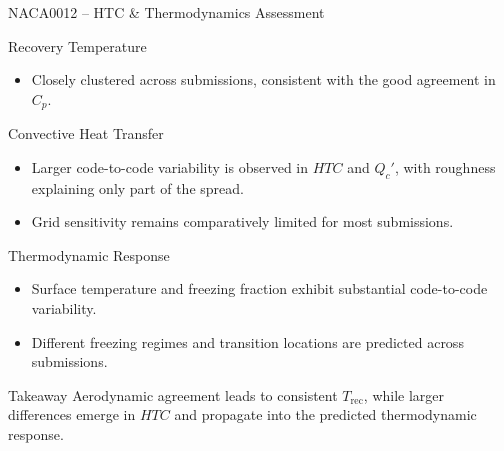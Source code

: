 \begin{frame}{\small NACA0012 -- HTC \& Thermodynamics Assessment}
\scriptsize

\begin{block}{\scriptsize Recovery Temperature}
\begin{itemize}
    \item Closely clustered across submissions, consistent with the good agreement in $C_p$.
\end{itemize}
\end{block}

\vspace{0.12cm}

\begin{block}{\scriptsize Convective Heat Transfer}
\begin{itemize}
    \item Larger code-to-code variability is observed in $HTC$ and $Q_c'$, with roughness explaining only part of the spread.
    \item Grid sensitivity remains comparatively limited for most submissions.
\end{itemize}
\end{block}

\vspace{0.12cm}

\begin{block}{\scriptsize Thermodynamic Response}
\begin{itemize}
    \item Surface temperature and freezing fraction exhibit substantial code-to-code variability.
    \item Different freezing regimes and transition locations are predicted across submissions.
\end{itemize}
\end{block}

\vspace{0.12cm}

\begin{alertblock}{\scriptsize Takeaway}
Aerodynamic agreement leads to consistent $T_{\mathrm{rec}}$, while larger differences emerge in $HTC$ and propagate into the predicted thermodynamic response.
\end{alertblock}

\end{frame}
